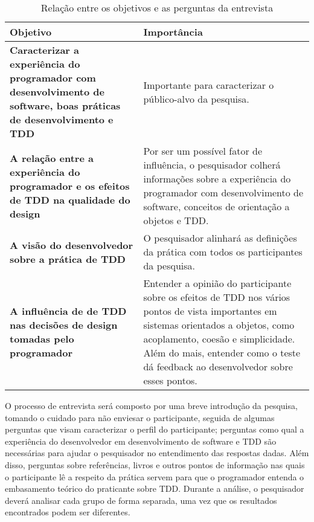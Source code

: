 \begin{table}[h!]
	\begin{tabular}{ | p{6cm} | p{7cm} | }
		\hline
		
		Objetivo & Importância \\
		
		\hline
		\textbf{Caracterizar a experiência do programador com desenvolvimento de
		software, boas práticas de desenvolvimento e TDD} 
		&
		Importante para caracterizar o público-alvo da pesquisa.

		\\

		\hline
		\textbf{A relação entre a experiência do programador e os efeitos de TDD
		na qualidade do design} 
		&
		Por ser um possível fator de influência, o pesquisador colherá
		informações sobre a experiência do programador com desenvolvimento de software, 
		conceitos de orientação a objetos e TDD.

		\\

		\hline
		\textbf{A visão do desenvolvedor sobre a prática de TDD} 
		&
		O pesquisador alinhará as definições da prática com todos os participantes da
		pesquisa.

		\\

		\hline
		\textbf{A influência de de TDD nas decisões de design tomadas pelo programador} 
		&
		Entender a opinião do participante sobre os efeitos de TDD
		nos vários pontos de vista importantes em sistemas orientados a objetos, como
		acoplamento, coesão e simplicidade. Além do mais, entender como o teste
		dá feedback ao desenvolvedor sobre esses pontos.
		
		\\

		\hline												
	\end{tabular}
	\caption{Relação entre os objetivos e as perguntas da entrevista}
	\label{tab:questoes}
\end{table}

O processo de entrevista será composto por uma breve introdução da pesquisa, tomando
o cuidado para não enviesar o participante, seguida de algumas perguntas que visam
caracterizar o perfil do participante; perguntas como qual a experiência do
desenvolvedor em desenvolvimento de software e TDD são necessárias para ajudar o
pesquisador no entendimento das respostas dadas. Além disso, perguntas sobre
referências, livros e outros pontos de informação nas quais o participante lê a
respeito da prática servem para que o programador entenda o embasamento teórico
do praticante sobre TDD. Durante a análise, o pesquisador deverá analisar cada
grupo de forma separada, uma vez que os resultados encontrados podem ser
diferentes.

